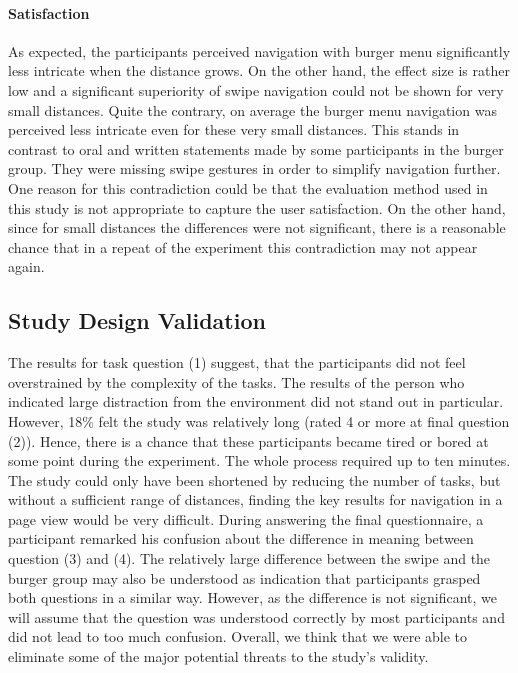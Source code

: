 \documentclass{sig-alternate-05-2015}
\begin{document}
\paragraph{Satisfaction}
As expected, the participants perceived navigation with burger menu significantly less intricate when the distance grows. 
On the other hand, the effect size is rather low and a significant superiority of swipe navigation could not be shown for very small distances. Quite the contrary,
on average the burger menu navigation was perceived less intricate even for these very small distances. This stands in contrast to oral and written statements made by some
participants in the burger group. They were missing swipe gestures in order to simplify navigation further. One reason for this contradiction could be that the
evaluation method used in this study is not appropriate to capture the user satisfaction. On the other hand, since for small distances the differences were not significant, there
is a reasonable chance that in a repeat of the experiment this contradiction may not appear again.
\subsection{Study Design Validation}
The results for task question (1) suggest, that the participants did not feel overstrained by the complexity of the tasks. The results of the person who indicated large
distraction from the environment did not stand out in particular. However, 18\% felt the study was relatively long (rated 4 or more at final question (2)). Hence, there is a chance
that these participants became tired or bored at some point during the experiment. The whole process required up to ten minutes. The study could only have been shortened by
reducing the number of tasks, but without a sufficient range of distances, finding the key results for navigation in a page view would be very difficult. 
During answering the final questionnaire, a participant remarked his confusion about the difference in meaning between question (3) and (4). The relatively large difference
between the swipe and the burger group may also be understood as indication that participants grasped both questions in a similar way.  
However, as the difference is not significant, we will assume that the question was understood correctly by most participants and did not lead to too much confusion.
Overall, we think that we were able to eliminate some of the major potential threats to the study's validity. 
\end{document}
